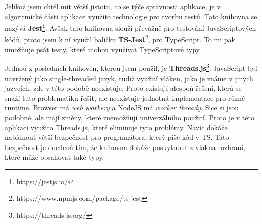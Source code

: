 Jelikož jsem chtěl mít větší jistotu, co se týče správnosti aplikace, je v algoritmické části aplikace využito technologie pro tvorbu testů. 
Tato knihovna se nazývá \textbf{Jest}\footnote{https://jestjs.io/}.
Avšak tato knihovna slouží převážně pro testování JavaScriptových kódů, proto jsem k ní využil balíčku \textbf{TS-Jest}\footnote{https://www.npmjs.com/package/ts-jest}, pro TypeScript.
To mi pak umožňuje psát testy, které mohou využívat TypeScriptové typy.

Jednou z posledních knihoven, kterou jsem použil, je \textbf{Threads.js}\footnote{https://threads.js.org/}. 
JavaScript byl navržený jako single-threaded jazyk, tudíž využití vláken, jako je známe v jiných jazycích, zde v této podobě neexistuje.
Proto existují alespoň řešení, která se snaží tuto problematiku řešit, ale neexistuje jednotná implementace pro různé runtime.
Browser má \textit{web workery} a NodeJS má \textit{worker thready}.
Sice si jsou podobné, ale mají změny, které znemožňují univerzálního použití.
Proto je v této aplikaci využito Threads.js, které eliminuje tyto problémy.
Navíc dokáže nabídnout větší bezpečnost pro programátora, který píše kód v TS. 
Tato bezpečnost je docílená tím, že knihovna dokáže poskytnout z vlákna rozhraní, které může obsahovat také typy.

\endinput